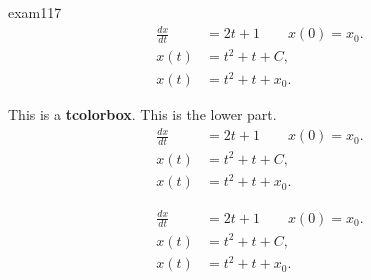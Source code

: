 \documentclass{scrbook}
\begin{document}
  \begin{mathexam}{%
    \blindtext}{exam117}
    \blindtext
    \begin{align}
      \frac{dx}{dt} &= 2t + 1 \qquad x(0) = x_0.  \nonumber \\ 
      x(t)          &= t^2 + t + C,                         \\ 
      x(t)          &= t^2+t+x_0.                 
    \end{align}
    \blindtext
\end{mathexam}  

\begin{tcolorbox}[fontlower=\sffamily\bfseries]
  This is a \textbf{tcolorbox}.
  \tcblower
  This is the lower part.
  \begin{align}
    \frac{dx}{dt} &= 2t + 1 \qquad x(0) = x_0.  \nonumber \\ 
    x(t)          &= t^2 + t + C,                         \\ 
    x(t)          &= t^2+t+x_0.                 
  \end{align}
\end{tcolorbox}

\begin{bigequbox}
  \begin{align}
    \frac{dx}{dt} &= 2t + 1 \qquad x(0) = x_0.  \nonumber \\ 
    x(t)          &= t^2 + t + C,                         \\ 
    x(t)          &= t^2+t+x_0.                 
  \end{align}
\end{bigequbox}
\end{document}
